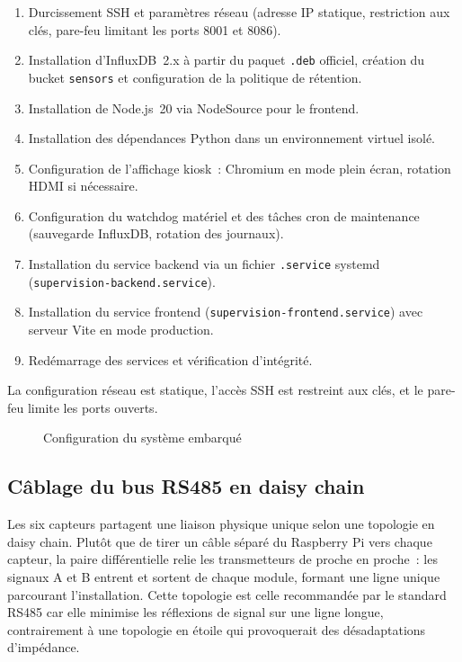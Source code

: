 \begin{enumerate}
  \item Durcissement SSH et paramètres réseau (adresse IP statique, restriction aux clés, pare-feu limitant les ports 8001 et 8086).
  \item Installation d'InfluxDB~2.x à partir du paquet \texttt{.deb} officiel, création du bucket \texttt{sensors} et configuration de la politique de rétention.
  \item Installation de Node.js~20 via NodeSource pour le frontend.
  \item Installation des dépendances Python dans un environnement virtuel isolé.
  \item Configuration de l'affichage kiosk~: Chromium en mode plein écran, rotation HDMI si nécessaire.
  \item Configuration du watchdog matériel et des tâches cron de maintenance (sauvegarde InfluxDB, rotation des journaux).
  \item Installation du service backend via un fichier \texttt{.service} systemd (\texttt{supervision-backend.service}).
  \item Installation du service frontend (\texttt{supervision-frontend.service}) avec serveur Vite en mode production.
  \item Redémarrage des services et vérification d'intégrité.
\end{enumerate}

La configuration réseau est statique, l'accès SSH est restreint aux clés, et le pare-feu limite les ports ouverts.

\begin{figure}[htbp]
  \centering
  \caption{Configuration du système embarqué}
  \label{fig:rpi_setup}
\end{figure}

\subsection{Câblage du bus RS485 en daisy chain}

Les six capteurs partagent une liaison physique unique selon une topologie en daisy chain. Plutôt que de tirer un câble séparé du Raspberry Pi vers chaque capteur, la paire différentielle relie les transmetteurs de proche en proche~: les signaux A et B entrent et sortent de chaque module, formant une ligne unique parcourant l'installation. Cette topologie est celle recommandée par le standard RS485 car elle minimise les réflexions de signal sur une ligne longue, contrairement à une topologie en étoile qui provoquerait des désadaptations d'impédance.

